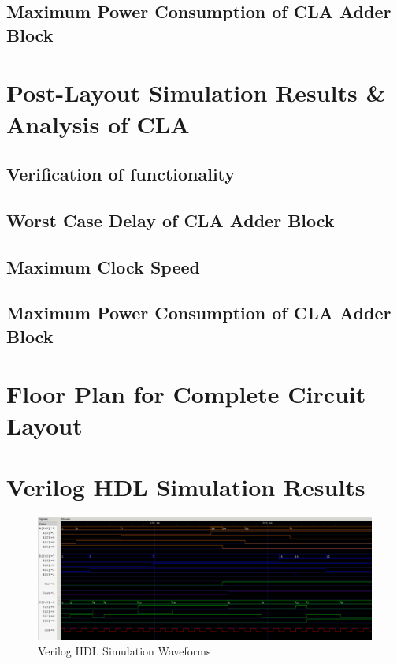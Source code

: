 \documentclass[conference]{IEEEtran}
\begin{document}
\subsection{Maximum Power Consumption of CLA Adder Block}

\section{Post-Layout Simulation Results \& Analysis of CLA}

\subsection{Verification of functionality}

\subsection{Worst Case Delay of CLA Adder Block}

\subsection{Maximum Clock Speed}

\subsection{Maximum Power Consumption of CLA Adder Block}

\section{Floor Plan for Complete Circuit Layout}

\section{Verilog HDL Simulation Results}

\begin{figure}[h]
    \centering
    \includegraphics[width=1\linewidth]{veriloggtk.png}
    \caption{Verilog HDL Simulation Waveforms}
    \label{fig:verilog_waveform}
\end{figure}
\end{document}
